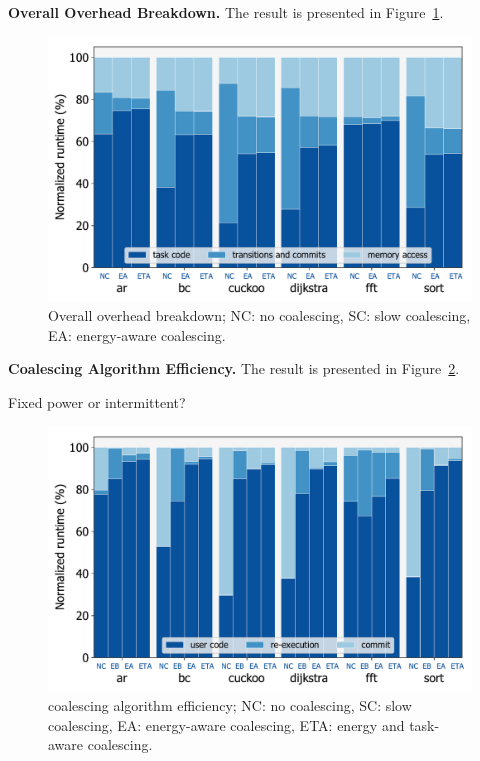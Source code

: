 \indent \textbf{Overall \sys Overhead Breakdown.} The result is presented in Figure~\ref{fig:overallOverheadBreakdown}.


\begin{figure}
	\centering
	\includegraphics[width=\columnwidth]{figures/overallOverhead}
	\caption{Overall \sys overhead breakdown; NC: no coalescing, SC: slow coalescing, EA: energy-aware coalescing.}
	\label{fig:overallOverheadBreakdown}
\end{figure}

\textbf{\sys Coalescing Algorithm Efficiency.} The result is presented in Figure~\ref{fig:coalEfficiency}.

Fixed power or intermittent?

\begin{figure}
	\centering
	\includegraphics[width=\columnwidth]{figures/coalEfficiency}
	\caption{\sys coalescing algorithm efficiency; NC: no coalescing, SC: slow coalescing, EA: energy-aware coalescing, ETA: energy and task-aware coalescing.}
	\label{fig:coalEfficiency}
\end{figure}

